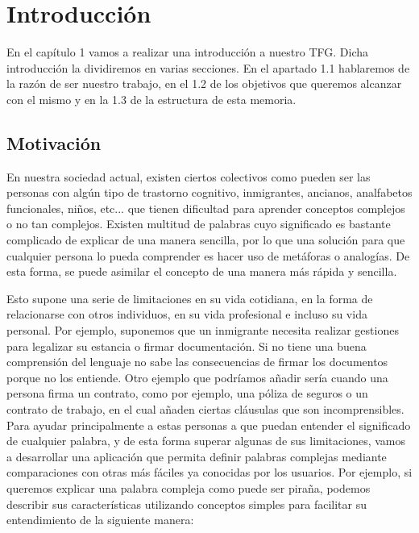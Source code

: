 \chapter{Introducción}
\label{cap:introduccion}




	En el capítulo 1 vamos a realizar una introducción a nuestro TFG. Dicha introducción la dividiremos en varias secciones. En el apartado 1.1 hablaremos de la razón de ser nuestro trabajo, en el 1.2 de los objetivos que queremos alcanzar con el mismo y en la 1.3 de la estructura de esta memoria.


\section{Motivación}
\label{cap:sec:motivacion}

En nuestra sociedad actual, existen ciertos colectivos como pueden ser las personas con algún tipo de trastorno cognitivo, inmigrantes, ancianos, analfabetos funcionales, niños, etc... que tienen dificultad para aprender conceptos complejos o no tan complejos. 
Existen multitud de palabras cuyo significado es bastante complicado de explicar de una manera sencilla, por lo que una solución para que cualquier persona lo pueda comprender es hacer uso de metáforas o analogías. De esta forma, se puede asimilar el concepto de una manera más rápida y sencilla. 

Esto supone una serie de limitaciones en su vida cotidiana, en la forma de relacionarse con otros individuos, en su vida profesional e incluso su vida personal. Por ejemplo, suponemos que un inmigrante necesita realizar gestiones para legalizar su estancia o firmar documentación. Si no tiene una buena comprensión del lenguaje no sabe las consecuencias de firmar los documentos porque no los entiende. 
Otro ejemplo que podríamos añadir sería cuando una persona firma un contrato, como por ejemplo, una póliza de seguros o un contrato de trabajo, en el cual añaden ciertas cláusulas que son incomprensibles. 
\newline
Para ayudar principalmente a estas personas a que puedan entender el significado de cualquier palabra, y de esta forma superar algunas de sus limitaciones, vamos a desarrollar una aplicación que permita definir palabras complejas mediante comparaciones con otras más fáciles ya conocidas por los usuarios. Por ejemplo, si queremos explicar una palabra compleja como puede ser piraña, podemos describir sus características utilizando conceptos simples para facilitar su entendimiento de la siguiente manera: \newline

